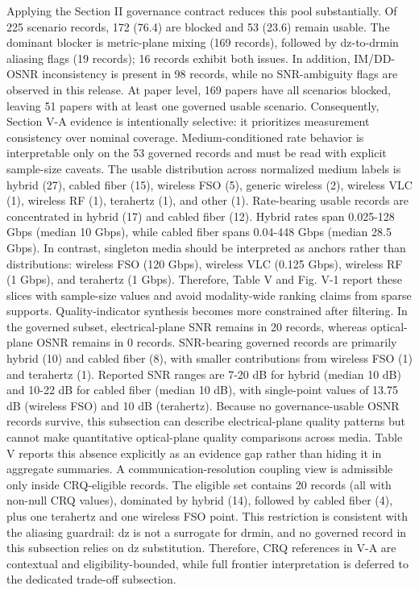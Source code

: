 {}Applying the Section II governance contract reduces this pool substantially. Of 225 scenario records, 172 (76.4\markdownRendererPercentSign{}) are blocked and 53 (23.6\markdownRendererPercentSign{}) remain usable. The dominant blocker is metric-plane mixing (169 records), followed by dz-to-drmin aliasing flags (19 records); 16 records exhibit both issues. In addition, IM/DD-OSNR inconsistency is present in 98 records, while no SNR-ambiguity flags are observed in this release. At paper level, 169 papers have all scenarios blocked, leaving 51 papers with at least one governed usable scenario. Consequently, Section V-A evidence is intentionally selective: it prioritizes measurement consistency over nominal coverage.\markdownRendererParagraphSeparator
{}Medium-conditioned rate behavior is interpretable only on the 53 governed records and must be read with explicit sample-size caveats. The usable distribution across normalized medium labels is hybrid (27), cabled fiber (15), wireless FSO (5), generic wireless (2), wireless VLC (1), wireless RF (1), terahertz (1), and other (1). Rate-bearing usable records are concentrated in hybrid (17) and cabled fiber (12). Hybrid rates span 0.025-128 Gbps (median 10 Gbps), while cabled fiber spans 0.04-448 Gbps (median 28.5 Gbps). In contrast, singleton media should be interpreted as anchors rather than distributions: wireless FSO (120 Gbps), wireless VLC (0.125 Gbps), wireless RF (1 Gbps), and terahertz (1 Gbps). Therefore, Table V and Fig. V-1 report these slices with sample-size values and avoid modality-wide ranking claims from sparse supports.\markdownRendererParagraphSeparator
{}Quality-indicator synthesis becomes more constrained after filtering. In the governed subset, electrical-plane SNR remains in 20 records, whereas optical-plane OSNR remains in 0 records. SNR-bearing governed records are primarily hybrid (10) and cabled fiber (8), with smaller contributions from wireless FSO (1) and terahertz (1). Reported SNR ranges are 7-20 dB for hybrid (median 10 dB) and 10-22 dB for cabled fiber (median 10 dB), with single-point values of 13.75 dB (wireless FSO) and 10 dB (terahertz). Because no governance-usable OSNR records survive, this subsection can describe electrical-plane quality patterns but cannot make quantitative optical-plane quality comparisons across media. Table V reports this absence explicitly as an evidence gap rather than hiding it in aggregate summaries.\markdownRendererParagraphSeparator
{}A communication-resolution coupling view is admissible only inside CRQ-eligible records. The eligible set contains 20 records (all with non-null CRQ values), dominated by hybrid (14), followed by cabled fiber (4), plus one terahertz and one wireless FSO point. This restriction is consistent with the aliasing guardrail: dz is not a surrogate for drmin, and no governed record in this subsection relies on dz substitution. Therefore, CRQ references in V-A are contextual and eligibility-bounded, while full frontier interpretation is deferred to the dedicated trade-off subsection.\markdownRendererParagraphSeparator
